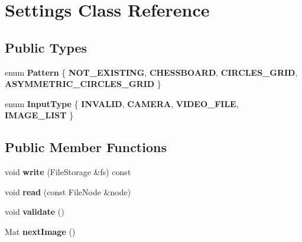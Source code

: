 \hypertarget{class_settings}{}\section{Settings Class Reference}
\label{class_settings}
\subsection*{Public Types}
\begin{DoxyCompactItemize}
\item 
\mbox{\label{class_settings_a0e7117abd9427a6f8bc1d1d8d456b5c8}} 
enum {\bfseries Pattern} \{ {\bfseries N\+O\+T\+\_\+\+E\+X\+I\+S\+T\+I\+NG}, 
{\bfseries C\+H\+E\+S\+S\+B\+O\+A\+RD}, 
{\bfseries C\+I\+R\+C\+L\+E\+S\+\_\+\+G\+R\+ID}, 
{\bfseries A\+S\+Y\+M\+M\+E\+T\+R\+I\+C\+\_\+\+C\+I\+R\+C\+L\+E\+S\+\_\+\+G\+R\+ID}
 \}
\item 
\mbox{\label{class_settings_a5afe85d24b071973a7f248c05386f7f4}} 
enum {\bfseries Input\+Type} \{ {\bfseries I\+N\+V\+A\+L\+ID}, 
{\bfseries C\+A\+M\+E\+RA}, 
{\bfseries V\+I\+D\+E\+O\+\_\+\+F\+I\+LE}, 
{\bfseries I\+M\+A\+G\+E\+\_\+\+L\+I\+ST}
 \}
\end{DoxyCompactItemize}
\subsection*{Public Member Functions}
\begin{DoxyCompactItemize}
\item 
\mbox{\label{class_settings_a0785cc2055091b2a857b1dcefe291acc}} 
void {\bfseries write} (File\+Storage \&fs) const
\item 
\mbox{\label{class_settings_a2d7841f8441095032e0f3b7d20adfd3f}} 
void {\bfseries read} (const File\+Node \&node)
\item 
\mbox{\label{class_settings_a29016205c90b95d6247df18365a70dd0}} 
void {\bfseries validate} ()
\item 
\mbox{\label{class_settings_a7701462e928f2425b342440fba9973e5}} 
Mat {\bfseries next\+Image} ()
\end{DoxyCompactItemize}
